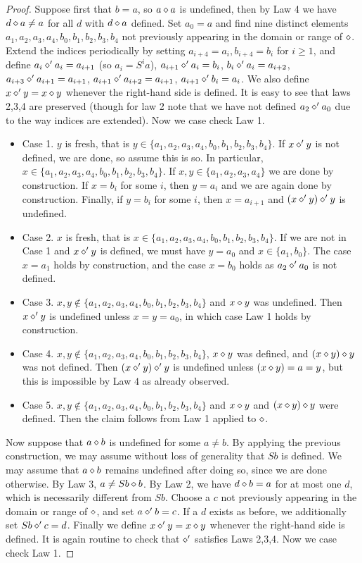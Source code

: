 \begin{proof}  Suppose first that $b=a$, so $a \diamond a$ is undefined, then by Law 4 we have $d \diamond a \neq a$ for all $d$ with $d \diamond a$ defined. Set $a_0=a$ and find nine distinct elements $a_1,a_2,a_3,a_4,b_0,b_1,b_2,b_3,b_4$ not previously appearing in the domain or range of $\diamond$. Extend the indices periodically by setting $a_{i+4} = a_i,b_{i+4} = b_i$ for $i \ge 1$, and define $a_i \diamond' a_i = a_{i+1}$ (so $a_i = S^i a$), $a_{i+1} \diamond' a_i = b_i$, $b_i \diamond' a_i = a_{i+2}$, $a_{i+3} \diamond' a_{i+1} = a_{i+1}$, $a_{i+1} \diamond' a_{i+2} = a_{i+1}$, $a_{i+1} \diamond' b_i = a_i$.  We also define $x \diamond' y = x \diamond y$ whenever the right-hand side is defined. It is easy to see that laws 2,3,4 are preserved (though for law 2 note that we have not defined $a_2 \diamond' a_0$ due to the way indices are extended). Now we case check Law 1.  \begin{itemize}
    \item Case 1. $y$ is fresh, that is $y \in \{a_1,a_2,a_3,a_4,b_0,b_1,b_2,b_3,b_4\}$. If $x \diamond' y$ is not defined, we are done, so assume this is so. In particular, $x  \in \{a_1,a_2,a_3,a_4,b_0,b_1,b_2,b_3,b_4\}$. If $x,y \in \{a_1,a_2,a_3,a_4\}$ we are done by construction. If $x = b_i$ for some $i$, then $y = a_i$ and we are again done by construction. Finally, if $y = b_i$ for some $i$, then $x = a_{i+1}$ and $(x \diamond' y) \diamond' y$ is undefined.
    \item Case 2. $x$ is fresh, that is $x \in \{a_1,a_2,a_3,a_4,b_0,b_1,b_2,b_3,b_4\}$. If we are not in Case 1 and $x \diamond' y$ is defined, we must have $y = a_0$ and $x \in \{a_1, b_0\}$. The case $x = a_1$ holds by construction, and the case $x = b_0$ holds as $a_2 \diamond' a_0$ is not defined.
    \item Case 3. $x,y \not \in  \{a_1,a_2,a_3,a_4,b_0,b_1,b_2,b_3,b_4\}$ and $x \diamond y$ was undefined. Then $x \diamond' y$ is undefined unless $x=y=a_0$, in which case Law 1 holds by construction.
    \item Case 4. $x,y \not \in  \{a_1,a_2,a_3,a_4,b_0,b_1,b_2,b_3,b_4\}$, $x \diamond y$ was defined, and $(x \diamond y) \diamond y$ was not defined. Then $(x \diamond' y) \diamond' y$ is undefined unless $(x \diamond y) = a = y$, but this is impossible by Law $4$ as already observed.
    \item Case 5. $x,y \not \in  \{a_1,a_2,a_3,a_4,b_0,b_1,b_2,b_3,b_4\}$ and $x \diamond y$ and $(x \diamond y) \diamond y$ were defined. Then the claim follows from Law 1 applied to $\diamond$.
\end{itemize}

Now suppose that $a \diamond b$ is undefined for some $a \neq b$.  By applying the previous construction, we may assume without loss of generality that $Sb$ is defined.  We may assume that $a \diamond b$ remains undefined after doing so, since we are done otherwise.  By Law 3, $a \neq Sb \diamond b$.  By Law 2, we have $d \diamond b = a$ for at most one $d$, which is necessarily different from $Sb$.  Choose a $c$ not previously appearing in the domain or range of $\diamond$, and set $a \diamond' b = c$.  If a $d$ exists as before, we additionally set $Sb \diamond' c = d$.  Finally we define $x \diamond' y = x \diamond y$ whenever the right-hand side is defined.
It is again routine to check that $\diamond'$ satisfies Laws 2,3,4.  Now we case check Law 1.


\end{proof}
